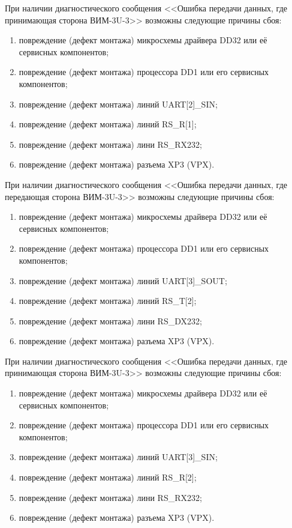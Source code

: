     \subpoint При наличии диагностического сообщения <<Ошибка передачи данных, где принимающая сторона ВИМ-3U-3>> возможны следующие причины сбоя:
      \begin{enumerate}
	\item повреждение (дефект монтажа) микросхемы драйвера DD32 или её сервисных компонентов;
	\item повреждение (дефект монтажа) процессора DD1 или его сервисных компонентов;
	\item повреждение (дефект монтажа) линий UART[2]\_SIN;
	\item повреждение (дефект монтажа) линий RS\_R[1];
	\item повреждение (дефект монтажа) лини RS\_RX232;
	\item повреждение (дефект монтажа) разъема XP3 (VPX).	  
      \end{enumerate}   
      
    \subpoint При наличии диагностического сообщения <<Ошибка передачи данных, где передающая сторона ВИМ-3U-3>> возможны следующие причины сбоя:
      \begin{enumerate}
	\item повреждение (дефект монтажа) микросхемы драйвера DD32 или её сервисных компонентов;
	\item повреждение (дефект монтажа) процессора DD1 или его сервисных компонентов;
	\item повреждение (дефект монтажа) линий UART[3]\_SOUT;
	\item повреждение (дефект монтажа) линий RS\_T[2];
	\item повреждение (дефект монтажа) лини RS\_DX232;
	\item повреждение (дефект монтажа) разъема XP3 (VPX).
      \end{enumerate}
      
    \subpoint При наличии диагностического сообщения <<Ошибка передачи данных, где принимающая сторона ВИМ-3U-3>> возможны следующие причины сбоя:
      \begin{enumerate}
	\item повреждение (дефект монтажа) микросхемы драйвера DD32 или её сервисных компонентов;
	\item повреждение (дефект монтажа) процессора DD1 или его сервисных компонентов;
	\item повреждение (дефект монтажа) линий UART[3]\_SIN;
	\item повреждение (дефект монтажа) линий RS\_R[2];
	\item повреждение (дефект монтажа) лини RS\_RX232;
	\item повреждение (дефект монтажа) разъема XP3 (VPX).
      \end{enumerate}  
      
